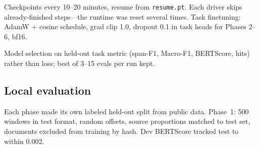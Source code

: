 \documentclass[11pt, oneside]{article}
\begin{document}
Checkpoints every 10--20 minutes, resume from \texttt{resume.pt}. Each driver skips already-finished
steps---the runtime was reset several times. Task finetuning: AdamW + cosine schedule, grad clip 1.0,
dropout 0.1 in task heads for Phases 2--6, bf16.

Model selection on held-out task metric (span-F1, Macro-F1, BERTScore, hits) rather than loss; best of
3--15 evals per run kept.

\begin{table}[t]
\centering
\scriptsize
\caption{Hyperparameters of the final neural component in each phase (adapter LR shown for PEFT runs).}
\label{tab:hparams}
\end{table}

\subsection{Local evaluation}
Each phase made its own labeled held-out split from public data. Phase~1: 500 windows in test format,
random offsets, source proportions matched to test set, documents excluded from training by hash. Dev
BERTScore tracked test to within 0.002.
\end{document}
